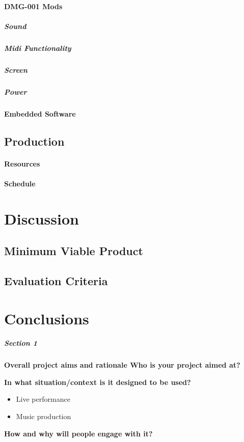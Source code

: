 \documentclass[]{article}
\begin{document}
        \paragraph{DMG-001 Mods}
            \subparagraph{Sound}
            \subparagraph{Midi Functionality}
            \subparagraph{Screen}
            \subparagraph{Power}
        \paragraph{Embedded Software}
    \subsection{Production}
        \paragraph{Resources}
        \paragraph{Schedule}

\section{Discussion}
    \subsection{Minimum Viable Product}
    \subsection{Evaluation Criteria}

\section{Conclusions}

\subparagraph[]{Section 1}
    \textbf{Overall project aims and rationale Who is your project aimed at?}

    \textbf{In what situation/context is it designed to be used?}
    
        \begin{itemize}
        \item Live performance
        \item Music production
        \end{itemize}

    \textbf{How and why will people engage with it?}
\end{document}

